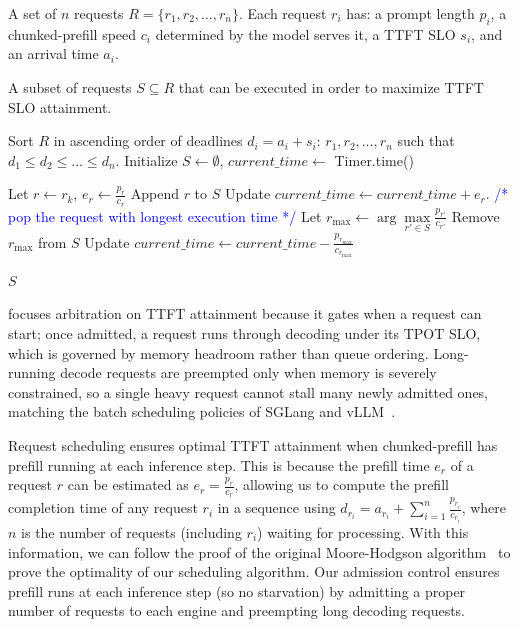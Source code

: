 \begin{algorithm}[t]
\small
\caption{GPU-Local Request Scheduling}
\label{alg:local}
\begin{algorithmic}[1]
\Require A set of $n$ requests $R = \{r_1, r_2, \dots, r_n\}$. Each request $r_i$ has: a prompt length $p_i$, a chunked-prefill speed $c_i$ determined by the model serves it, a TTFT SLO $s_i$, and an arrival time $a_i$.

\Ensure A subset of requests $S \subseteq R$ that can be executed in order to maximize TTFT SLO attainment.

\State Sort $R$ in ascending order of deadlines $d_i = a_i + s_i$: 
$r_1, r_2, \dots, r_n$ such that $d_1 \leq d_2 \leq \dots \leq d_n$.
\State Initialize $S \leftarrow \emptyset$, $current\_time \leftarrow$ Timer.time()

  \State Let $r \leftarrow r_{k}$, $e_r \leftarrow \frac{p_r}{c_r}$
  \State Append $r$ to $S$
  \State Update $current\_time \leftarrow current\_time + e_r$.
    \State \textcolor{blue}{/* pop the request with longest execution time */}
    \State Let $r_{\text{max}} \leftarrow \arg\max\limits_{r' \in S} \frac{p_{r'}}{c_{r'}}$
    \State Remove $r_{\text{max}}$ from $S$
    \State Update $current\_time \leftarrow current\_time - \frac{p_{r_{\text{max}}}}{c_{r_{\text{max}}}}$
  \EndIf
\EndFor

\State \Return $S$

\end{algorithmic}
\end{algorithm}

 \tool focuses arbitration on TTFT attainment because it gates when a request can start; once admitted, a request runs through decoding under its TPOT SLO, which is governed by memory headroom rather than queue ordering. Long-running decode requests are preempted only when memory is severely constrained, so a single heavy request cannot stall many newly admitted ones, matching the batch scheduling policies of SGLang and vLLM~\cite{sglang@arxiv23, kwon2023efficient}.

Request scheduling ensures optimal TTFT attainment when chunked-prefill has prefill running at each inference step.
This is because the prefill time $e_r$ of a request $r$ can be estimated as $e_r=\frac{p_r}{c_r}$, allowing us to compute the prefill completion time of any request $r_i$ in a sequence using $d_{r_i}=a_{r_i} + \sum_{i=1}^{n}\frac{p_{r_i}}{c_{r_i}}$, where $n$ is the number of requests (including $r_i$) waiting for processing.
With this information, we can follow the proof of the original Moore-Hodgson algorithm~\cite{cheriyan2021simple} to prove the optimality of our scheduling algorithm.
Our admission control ensures prefill runs at each inference step (so no starvation) by admitting a proper number of requests to each engine and preempting long decoding requests.